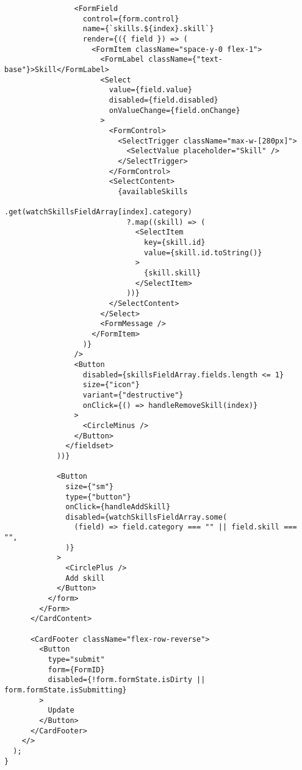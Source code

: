 \begin{verbatim}
                <FormField
                  control={form.control}
                  name={`skills.${index}.skill`}
                  render={({ field }) => (
                    <FormItem className="space-y-0 flex-1">
                      <FormLabel className={"text-base"}>Skill</FormLabel>
                      <Select
                        value={field.value}
                        disabled={field.disabled}
                        onValueChange={field.onChange}
                      >
                        <FormControl>
                          <SelectTrigger className="max-w-[280px]">
                            <SelectValue placeholder="Skill" />
                          </SelectTrigger>
                        </FormControl>
                        <SelectContent>
                          {availableSkills
                            .get(watchSkillsFieldArray[index].category)
                            ?.map((skill) => (
                              <SelectItem
                                key={skill.id}
                                value={skill.id.toString()}
                              >
                                {skill.skill}
                              </SelectItem>
                            ))}
                        </SelectContent>
                      </Select>
                      <FormMessage />
                    </FormItem>
                  )}
                />
                <Button
                  disabled={skillsFieldArray.fields.length <= 1}
                  size={"icon"}
                  variant={"destructive"}
                  onClick={() => handleRemoveSkill(index)}
                >
                  <CircleMinus />
                </Button>
              </fieldset>
            ))}

            <Button
              size={"sm"}
              type={"button"}
              onClick={handleAddSkill}
              disabled={watchSkillsFieldArray.some(
                (field) => field.category === "" || field.skill === "",
              )}
            >
              <CirclePlus />
              Add skill
            </Button>
          </form>
        </Form>
      </CardContent>

      <CardFooter className="flex-row-reverse">
        <Button
          type="submit"
          form={FormID}
          disabled={!form.formState.isDirty || form.formState.isSubmitting}
        >
          Update
        </Button>
      </CardFooter>
    </>
  );
}
\end{verbatim}